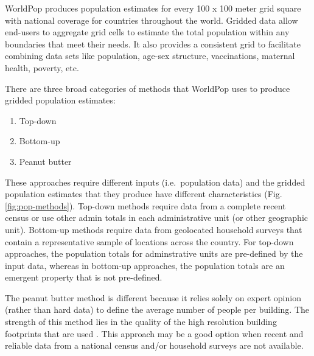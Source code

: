 \documentclass[]{book}
\providecommand{\tightlist}{%
  \setlength{\itemsep}{0pt}\setlength{\parskip}{0pt}}
\begin{document}
WorldPop produces population estimates for every 100 x 100 meter grid
square with national coverage for countries throughout the world.
Gridded data allow end-users to aggregate grid cells to estimate the
total population within any boundaries that meet their needs. It also
provides a consistent grid to facilitate combining data sets like
population, age-sex structure, vaccinations, maternal health, poverty,
etc.

There are three broad categories of methods that WorldPop uses to
produce gridded population estimates:

\begin{enumerate}
\def\labelenumi{\arabic{enumi}.}
\tightlist
\item
  Top-down\\
\item
  Bottom-up\\
\item
  Peanut butter
\end{enumerate}

These approaches require different inputs (i.e.~population data) and the
gridded population estimates that they produce have different
characteristics (Fig. \ref{fig:pop-methods}). Top-down methods require
data from a complete recent census or use other admin totals in each
administrative unit (or other geographic unit). Bottom-up methods
require data from geolocated household surveys that contain a
representative sample of locations across the country. For top-down
approaches, the population totals for adminstrative units are
pre-defined by the input data, whereas in bottom-up approaches, the
population totals are an emergent property that is not pre-defined.

The peanut butter method is different because it relies solely on expert
opinion (rather than hard data) to define the average number of people
per building. The strength of this method lies in the quality of the
high resolution building footprints that are used
\citep{ecopia2020digitize}. This approach may be a good option when
recent and reliable data from a national census and/or household surveys
are not available.
\end{document}
